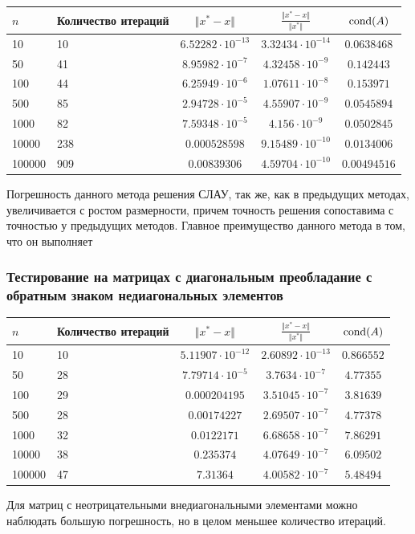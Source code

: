 \documentclass[english]{article}
\begin{document}
\begin{center}
  \begin{longtable}{l|l|c|c|c}
    \(n\) & Количество итераций & \(\Vert x^* - x \Vert\) & \(\frac{\Vert x^* - x \Vert}{\Vert x^* \Vert}\) & \(\mathop{\rm cond}(A) \)\\
    \hline
    10 & 10 & \(6.52282\cdot 10^{-13}\) & \(3.32434\cdot 10^{-14}\) & \(0.0638468\) \\
    50 & 41 & \(8.95982\cdot 10^{-7}\) & \(4.32458\cdot 10^{-9}\) & \(0.142443\) \\
    100 & 44 & \(6.25949\cdot 10^{-6}\) & \(1.07611\cdot 10^{-8}\) & \(0.153971\) \\
    500 & 85 & \(2.94728\cdot 10^{-5}\) & \(4.55907\cdot 10^{-9}\) & \(0.0545894\) \\
    1000 & 82 & \(7.59348\cdot 10^{-5}\) & \(4.156\cdot 10^{-9}\) & \(0.0502845\) \\
    10000 & 238 & \(0.000528598\) & \(9.15489\cdot 10^{-10}\) & \(0.0134006\) \\
    100000 & 909 & \(0.00839306\) & \(4.59704\cdot 10^{-10}\) & \(0.00494516\)
  \end{longtable}
\end{center}
Погрешность данного метода решения СЛАУ, так же, как в предыдущих методах,
увеличивается с ростом размерности, причем точность
решения сопоставима с точностью у предыдущих методов. Главное преимущество данного метода в том, что он
выполняет
\subsubsection{Тестирование на матрицах с диагональным преобладание с обратным знаком недиагональных элементов}
\begin{center}
  \begin{longtable}{l|l|c|c|c}
    \(n\) & Количество итераций & \(\Vert x^* - x \Vert\) & \(\frac{\Vert x^* - x \Vert}{\Vert x^* \Vert}\) & \(\mathop{\rm cond}(A) \)\\
    \hline
    10 & 10 & \(5.11907\cdot 10^{-12}\) & \(2.60892\cdot 10^{-13}\) & \(0.866552\) \\
    50 & 28 & \(7.79714\cdot 10^{-5}\) & \(3.7634\cdot 10^{-7}\) & \(4.77355\) \\
    100 & 29 & \(0.000204195\) & \(3.51045\cdot 10^{-7}\) & \(3.81639\) \\
    500 & 28 & \(0.00174227\) & \(2.69507\cdot 10^{-7}\) & \(4.77378\) \\
    1000 & 32 & \(0.0122171\) & \(6.68658\cdot 10^{-7}\) & \(7.86291\) \\
    10000 & 38 & \(0.235374\) & \(4.07649\cdot 10^{-7}\) & \(6.09502\) \\
    100000 & 47 & \(7.31364\) & \(4.00582\cdot 10^{-7}\) & \(5.48494\)
  \end{longtable}
\end{center}
Для матриц с неотрицательными внедиагональными элементами можно наблюдать большую погрешность, но в целом меньшее количество итераций.
\end{document}
